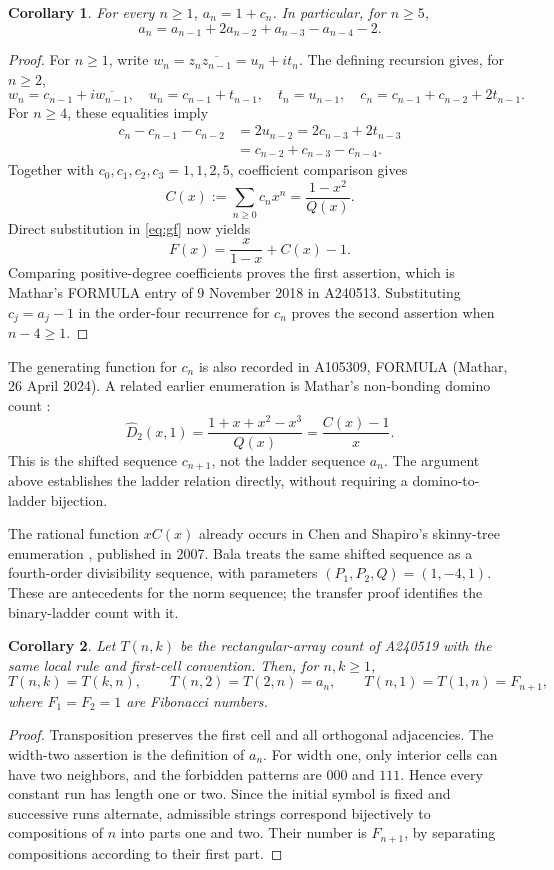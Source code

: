 \documentclass[11pt]{article}
\newtheorem{corollary}{Corollary}
\begin{document}
\begin{corollary}\label{cor:norm}
For every $n\geq1$, $a_n=1+c_n$. In particular, for $n\geq5$,
\[
 a_n=a_{n-1}+2a_{n-2}+a_{n-3}-a_{n-4}-2.
\]
\end{corollary}
\begin{proof}
For $n\geq1$, write $w_n=z_n\overline{z_{n-1}}=u_n+i t_n$.
The defining recursion gives, for $n\geq2$,
\[
 w_n=c_{n-1}+i\overline{w_{n-1}},\quad
 u_n=c_{n-1}+t_{n-1},\quad t_n=u_{n-1},\quad
 c_n=c_{n-1}+c_{n-2}+2t_{n-1}.
\]
For $n\geq4$, these equalities imply
\begin{align*}
 c_n-c_{n-1}-c_{n-2}
 &=2u_{n-2}=2c_{n-3}+2t_{n-3}\\
 &=c_{n-2}+c_{n-3}-c_{n-4}.
\end{align*}
Together with $c_0,c_1,c_2,c_3=1,1,2,5$, coefficient comparison gives
\[
 C(x):=\sum_{n\geq0}c_nx^n=\frac{1-x^2}{Q(x)}.
\]
Direct substitution in \eqref{eq:gf} now yields
\[
 F(x)=\frac{x}{1-x}+C(x)-1.
\]
Comparing positive-degree coefficients proves the first assertion,
which is Mathar's FORMULA entry of 9 November 2018 in A240513.
Substituting $c_j=a_j-1$ in the order-four recurrence for $c_n$ proves
the second assertion when $n-4\geq1$.
\end{proof}

The generating function for $c_n$ is also recorded in A105309,
FORMULA (Mathar, 26 April 2024). A related earlier enumeration is
Mathar's non-bonding domino count \cite[p.~8, Eq.~(12)]{mathar}:
\[
 \widehat D_2(x,1)=\frac{1+x+x^2-x^3}{Q(x)}
                  =\frac{C(x)-1}{x}.
\]
This is the shifted sequence $c_{n+1}$, not the ladder sequence $a_n$.
The argument above establishes the ladder relation directly, without
requiring a domino-to-ladder bijection.

The rational function $xC(x)$ already occurs in Chen and Shapiro's
skinny-tree enumeration \cite[Theorem~16]{chen}, published in 2007.
Bala \cite[Eqs.~(5)--(6), (19)--(22)]{bala} treats the same shifted
sequence as a fourth-order divisibility sequence, with parameters
$(P_1,P_2,Q)=(1,-4,1)$. These are antecedents for the norm sequence;
the transfer proof identifies the binary-ladder count with it.

\begin{corollary}\label{cor:rectangle}
Let $T(n,k)$ be the rectangular-array count of A240519 with the same
local rule and first-cell convention. Then, for $n,k\geq1$,
\[
 T(n,k)=T(k,n),\qquad T(n,2)=T(2,n)=a_n,\qquad
 T(n,1)=T(1,n)=F_{n+1},
\]
where $F_1=F_2=1$ are Fibonacci numbers.
\end{corollary}
\begin{proof}
Transposition preserves the first cell and all orthogonal adjacencies.
The width-two assertion is the definition of $a_n$.
For width one, only interior cells can have two neighbors, and the
forbidden patterns are $000$ and $111$. Hence every constant run has
length one or two. Since the initial symbol is fixed and successive
runs alternate, admissible strings correspond bijectively to
compositions of $n$ into parts one and two. Their number is $F_{n+1}$,
by separating compositions according to their first part.
\end{proof}
\end{document}
